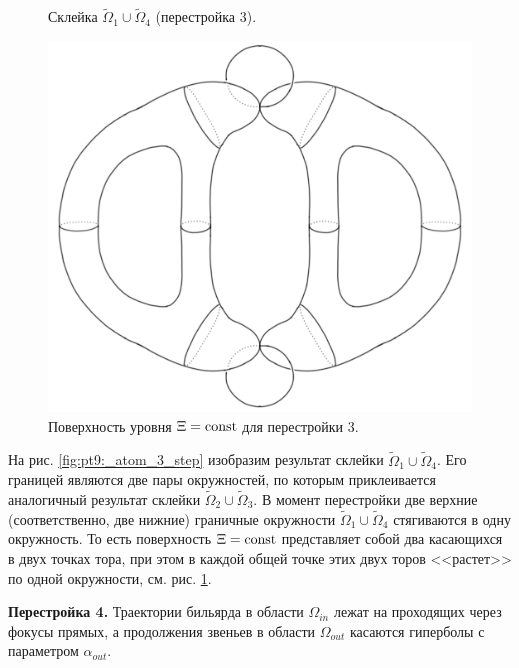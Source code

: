\begin{figure}[!htb]
    \caption{Склейка $\widetilde{\Omega}_1 \cup \widetilde{\Omega}_4$ (перестройка 3).}
    \label{fig:pt9:_atom_3_step}
\endminipage\hfill
{}
\centering
\includegraphics[scale=0.2]{images/ch4/section2/atoms/atom_3.pdf}
    \caption{Поверхность уровня $\Xi = \mathrm{const}$ для перестройки 3.}
    \label{fig:pt9:_atom_3}
\endminipage\hfill
\end{figure}

На рис. \ref{fig:pt9:_atom_3_step} изобразим результат склейки $\widetilde{\Omega}_1 \cup \widetilde{\Omega}_4$. Его границей являются две пары окружностей, по которым приклеивается  аналогичный результат склейки $\widetilde{\Omega}_2 \cup \widetilde{\Omega}_3$.
В момент перестройки две верхние (соответственно, две нижние) граничные окружности  $\widetilde{\Omega}_1 \cup \widetilde{\Omega}_4$ стягиваются в одну окружность. То есть поверхность $\Xi = \mathrm{const}$ представляет собой два касающихся в двух точках тора, при этом в каждой общей точке этих двух торов <<растет>> по одной окружности, см.  рис. \ref{fig:pt9:_atom_3}. 

\textbf{Перестройка 4.} 
Траектории бильярда в области $\Omega_{in}$ лежат на проходящих через фокусы прямых, а продолжения звеньев в области $\Omega_{out}$ касаются гиперболы с параметром $\alpha_{out}$. 

